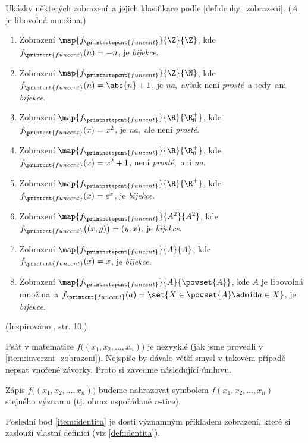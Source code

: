 \begin{example}
    Ukázky některých zobrazení~a jejich klasifikace podle \ref{def:druhy_zobrazeni}. ($A$ je libovolná množina.)
    \begin{enumerate}[label=(\roman*)]
        \item Zobrazení $\map{f_{\printnstepcnt{funccnt}}}{\Z}{\Z}$, kde $f_{\printcnt{funccnt}}(n)=-n$, je \emph{bijekce}.
        \item Zobrazení $\map{f_{\printnstepcnt{funccnt}}}{\Z}{\N}$, kde $f_{\printcnt{funccnt}}(n)=\abs{n}+1$, je \emph{na},~avšak není \emph{prosté}~a tedy~ani \emph{bijekce}.
        \item Zobrazení $\map{f_{\printnstepcnt{funccnt}}}{\R}{\R_0^+}$, kde $f_{\printcnt{funccnt}}(x)=x^2$, je \emph{na},~ale není \emph{prosté}.
        \item Zobrazení $\map{f_{\printnstepcnt{funccnt}}}{\R}{\R_0^+}$, kde $f_{\printcnt{funccnt}}(x)=x^2+1$, není \emph{prosté},~ani \emph{na}.
        \item Zobrazení $\map{f_{\printnstepcnt{funccnt}}}{\R}{\R^+}$, kde $f_{\printcnt{funccnt}}(x)=e^x$, je \emph{bijekce}.
        \item\label{item:inverzni_zobrazeni} Zobrazení $\map{f_{\printnstepcnt{funccnt}}}{A^2}{A^2}$, kde $f_{\printcnt{funccnt}}\bigl((x,y)\bigr)=(y,x)$, je \emph{bijekce}.
        \item\label{item:identita} Zobrazení $\map{f_{\printnstepcnt{funccnt}}}{A}{A}$, kde $f_{\printcnt{funccnt}}(x)=x$, je \emph{bijekce}.
        \item \sloppy Zobrazení $\map{f_{\printnstepcnt{funccnt}}}{A}{\powset{A}}$, kde $A$ je libovolná množina~a $f_{\printcnt{funccnt}}(a)=\set{X\in\powset{A}\admid a\in X}$, je \emph{bijekce}.
    \end{enumerate}
\end{example}
(Inspirováno \cite{Becvar2019}, str. 10.)\par
Psát v matematice $f\bigl((x_1,x_2,\dots,x_n)\bigr)$ je nezvyklé (jak jsme provedli v \ref{item:inverzni_zobrazeni}). Nejspíše by dávalo větší smysl v takovém případě nepsat vnořené závorky. Proto si zaveďme následující úmluvu.
\begin{convention}
    Zápis $f\bigl((x_1,x_2,\dots,x_n)\bigr)$ budeme nahrazovat symbolem $f(x_1,x_2,\dots,x_n)$ stejného významu (tj. obraz uspořádané $n$-tice).
\end{convention}
Poslední bod \ref{item:identita} je dosti významným příkladem zobrazení, které si zaslouží vlastní definici (viz \ref{def:identita}).

